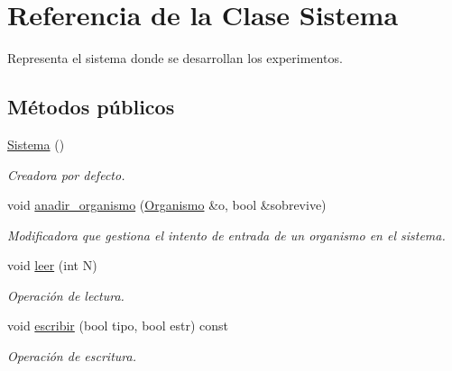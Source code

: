 \hypertarget{class_sistema}{\section{Referencia de la Clase Sistema}
\label{class_sistema}
}


Representa el sistema donde se desarrollan los experimentos.  


\subsection*{Métodos públicos}
\begin{DoxyCompactItemize}
\item 
\hyperlink{class_sistema_a815b07845ef6b03247b239333fe75e28}{Sistema} ()
\begin{DoxyCompactList}\small\item\em Creadora por defecto. \end{DoxyCompactList}\item 
void \hyperlink{class_sistema_a6522b718fc0701d38c2e2d2c2d2e88a6}{anadir\+\_\+organismo} (\hyperlink{class_organismo}{Organismo} \&o, bool \&sobrevive)
\begin{DoxyCompactList}\small\item\em Modificadora que gestiona el intento de entrada de un organismo en el sistema. \end{DoxyCompactList}\item 
void \hyperlink{class_sistema_ae670549104642dd4664ac8f794b4b1e9}{leer} (int N)
\begin{DoxyCompactList}\small\item\em Operación de lectura. \end{DoxyCompactList}\item 
void \hyperlink{class_sistema_a3f2a05a17345ee3be8331950fb2eedc0}{escribir} (bool tipo, bool estr) const 
\begin{DoxyCompactList}\small\item\em Operación de escritura. \end{DoxyCompactList}\end{DoxyCompactItemize}
